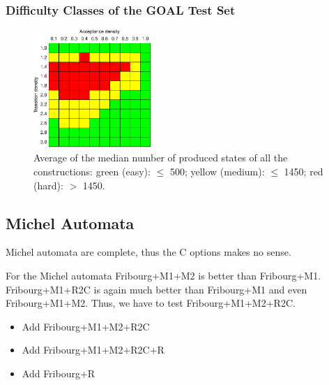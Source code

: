 \subsubsection{Difficulty Classes of the GOAL Test Set}

\begin{figure}[ht]
\centering
\includegraphics[width=0.4\textwidth]{figures/r/internal/goal/s.median.image.pdf}
\caption{Average of the median number of produced states of all the constructions: green (easy): $\leq$ 500; yellow (medium): $\leq$ 1450; red (hard): $>$ 1450.}
\end{figure}



\subsection{Michel Automata}
Michel automata are complete, thus the C options makes no sense.

For the Michel automata Fribourg+M1+M2 is better than Fribourg+M1. Fribourg+M1+R2C is again much better than Fribourg+M1 and even Fribourg+M1+M2. Thus, we have to test Fribourg+M1+M2+R2C. 

\begin{itemize}
\item Add Fribourg+M1+M2+R2C
\item Add Fribourg+M1+M2+R2C+R
\item Add Fribourg+R
\end{itemize}




